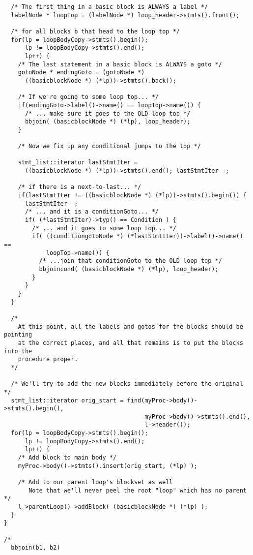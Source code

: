 \documentclass[10pt]{article}
\begin{document}
\begin{small}
\begin{verbatim}
  /* The first thing in a basic block is ALWAYS a label */
  labelNode * loopTop = (labelNode *) loop_header->stmts().front();

  /* for all blocks b that head to the loop top */
  for(lp = loopBodyCopy->stmts().begin();
      lp != loopBodyCopy->stmts().end();
      lp++) {
    /* The last statement in a basic block is ALWAYS a goto */
    gotoNode * endingGoto = (gotoNode *) 
      ((basicblockNode *) (*lp))->stmts().back();
      
    /* If we're going to some loop top... */
    if(endingGoto->label()->name() == loopTop->name()) {
      /* ... make sure it goes to the OLD loop top */
      bbjoin( (basicblockNode *) (*lp), loop_header);
    }

    /* Now we fix up any conditional jumps to the top */

    stmt_list::iterator lastStmtIter = 
      ((basicblockNode *) (*lp))->stmts().end(); lastStmtIter--;

    /* if there is a next-to-last... */
    if(lastStmtIter != ((basicblockNode *) (*lp))->stmts().begin()) {
      lastStmtIter--;
      /* ... and it is a conditionGoto... */
      if( (*lastStmtIter)->typ() == Condition ) {
        /* ... and it goes to some loop top... */
        if( ((conditiongotoNode *) (*lastStmtIter))->label()->name() ==
            loopTop->name()) {
          /* ...join that conditionGoto to the OLD loop top */
          bbjoincond( (basicblockNode *) (*lp), loop_header);
        }
      }
    }
  }

  /*
    At this point, all the labels and gotos for the blocks should be pointing
    at the correct places, and all that remains is to put the blocks into the
    procedure proper.
  */

  /* We'll try to add the new blocks immediately before the original */
  stmt_list::iterator orig_start = find(myProc->body()->stmts().begin(),
                                        myProc->body()->stmts().end(),
                                        l->header());
  for(lp = loopBodyCopy->stmts().begin();
      lp != loopBodyCopy->stmts().end();
      lp++) {
    /* Add block to main body */
    myProc->body()->stmts().insert(orig_start, (*lp) );
    
    /* Add to our parent loop's blockset as well
       Note that we'll never peel the root "loop" which has no parent */
    l->parentLoop()->addBlock( (basicblockNode *) (*lp) );
  }  
}

/*
  bbjoin(b1, b2)


\end{verbatim}
\end{small}
\end{document}
